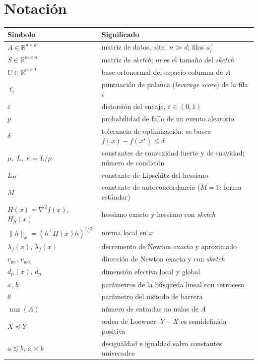 \documentclass[11pt,a4paper,oneside]{book}
\theoremstyle{definition}
\theoremstyle{remark}
\newcommand{\R}{\mathbb{R}}
\newcommand{\T}{^{\top}}
\newcommand{\eps}{\varepsilon}
\newcommand{\nrm}[1]{\lVert #1\rVert}
\DeclareMathOperator{\nnz}{nnz}
\newcommand{\lamf}{\lambda_f}
\newcommand{\lamt}{\widetilde{\lambda}_f}
\newcommand{\vne}{v_{\mathrm{ne}}}
\newcommand{\vnsk}{v_{\mathrm{nsk}}}
\newcommand{\dmu}{d_{\mu}}
\newcommand{\dmub}{\overline{d}_{\mu}}
\newcommand{\LH}{L_{H}}
\begin{document}
\section{Notación}\label{sec:notacion}

\begin{center}
\small
\begin{tabular}{@{}ll@{}}
\toprule
Símbolo & Significado \\
\midrule
$A\in\R^{n\times d}$ & matriz de datos, alta: $n\gg d$; filas $a_i\T$ \\
$S\in\R^{m\times n}$ & matriz de \emph{sketch}; $m$ es el tamaño del \emph{sketch} \\
$U\in\R^{n\times d}$ & base ortonormal del espacio columna de $A$ \\
$\ell_i$ & puntuación de palanca (\emph{leverage score}) de la fila $i$ \\
$\eps$ & distorsión del encaje, $\eps\in(0,1)$ \\
$p$ & probabilidad de fallo de un evento aleatorio \\
$\delta$ & tolerancia de optimización: se busca $f(x)-f(x^\star)\le\delta$ \\
$\mu,\;L,\;\kappa=L/\mu$ & constantes de convexidad fuerte y de suavidad; número de condición \\
$\LH$ & constante de Lipschitz del hessiano \\
$M$ & constante de autoconcordancia ($M=1$: forma estándar) \\
$H(x)=\nabla^2 f(x)$, $H_S(x)$ & hessiano exacto y hessiano con \emph{sketch} \\
$\nrm{h}_x=(h\T H(x)h)^{1/2}$ & norma local en $x$ \\
$\lamf(x)$, $\lamt(x)$ & decremento de Newton exacto y aproximado \\
$\vne$, $\vnsk$ & dirección de Newton exacta y con \emph{sketch} \\
$\dmu(x)$, $\dmub$ & dimensión efectiva local y global \\
$a,\,b$ & parámetros de la búsqueda lineal con retroceso \\
$\theta$ & parámetro del método de barrera \\
$\nnz(A)$ & número de entradas no nulas de $A$ \\
$X\preceq Y$ & orden de Loewner: $Y-X$ es semidefinida positiva \\
$a\lesssim b$, $a\asymp b$ & desigualdad e igualdad salvo constantes universales \\
\bottomrule
\end{tabular}
\end{center}
\end{document}
